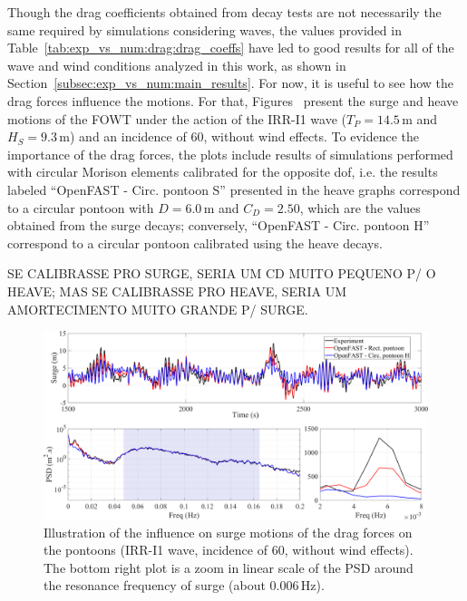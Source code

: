 Though the drag coefficients obtained from decay tests are not necessarily the same required by simulations considering waves, the values provided in Table~\ref{tab:exp_vs_num:drag:drag_coeffs} have led to good results for all of the wave and wind conditions analyzed in this work, as shown in Section~\ref{subsec:exp_vs_num:main_results}. For now, it is useful to see how the drag forces influence the motions. For that, Figures~ present the surge and heave motions of the FOWT under the action of the IRR-I1 wave ($T_P=14.5\,\text{m}$ and $H_S=9.3\,\text{m}$) and an incidence of 60\textdegree{}, without wind effects. To evidence the importance of the drag forces, the plots include results of simulations performed with circular Morison elements calibrated for the opposite dof, i.e. the results labeled \enquote{OpenFAST - Circ. pontoon S} presented in the heave graphs correspond to a circular pontoon with $D=6.0\,\text{m}$ and $C_D=2.50$, which are the values obtained from the surge decays; conversely, \enquote{OpenFAST - Circ. pontoon H} correspond to a circular pontoon calibrated using the heave decays. 

SE CALIBRASSE PRO SURGE, SERIA UM CD MUITO PEQUENO P/ O HEAVE; MAS SE CALIBRASSE PRO HEAVE, SERIA UM AMORTECIMENTO MUITO GRANDE P/ SURGE.

\begin{figure}[!hbtp]
	\centering
	\includegraphics[width=\textwidth]{./figures/ptfmsurge-drag_pontoon.png}	
	\caption{Illustration of the influence on surge motions of the drag forces on the pontoons (IRR-I1 wave, incidence of 60\textdegree{}, without wind effects). The bottom right plot is a zoom in linear scale of the PSD around the resonance frequency of surge (about $0.006\,\text{Hz}$).} \label{fig:exp_vs_num:drag:ptfmsurge}
\end{figure}

